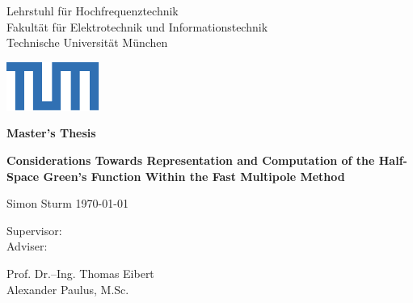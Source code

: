 \begin{titlepage}
	

	\newcommand{\UniversitaetLogoBreite}{19mm}
	\newcommand{\UniversitaetLogoHoehe}{1cm}

	\linespread{1}	
	\vspace*{-1cm}
    
	\setlength{\parindent}{0cm} 
	\begin{center}
		\begin{minipage}[l]{\textwidth-\UniversitaetLogoBreite}
			{ \footnotesize \color{TUMBlau}
				{\selectfont \small
					\textsf{Lehrstuhl für Hochfrequenztechnik\\
					Fakultät für Elektrotechnik und Informationstechnik\\
					Technische Universität München}\par}
			}
		\end{minipage}%
		\begin{minipage}[r]{\UniversitaetLogoBreite} %
			\includegraphics[width=\textwidth]{./titlepage/TUM_Logo_Web.pdf}
		\end{minipage}%
	\end{center}%
		
	\vspace{5cm}
	\Huge
	\textbf{Master's Thesis}
	\vspace{1.5cm}
	\LARGE
	\begin{flushleft}	
		\textbf{Considerations Towards Representation and Computation
		of the Half-Space Green's Function Within the Fast Multipole Method}
	\end{flushleft}
	\vspace{1cm}
	Simon Sturm  \qquad \qquad \today \\
	[3cm] 
	\large	
	\parbox[b][3cm][t]{2.2cm}{
		Supervisor: \\
	    Adviser: }
	\parbox[b][3cm][t]{6cm}{
		Prof. Dr.--Ing. Thomas Eibert\\
		Alexander Paulus, M.Sc.
		}				

\end{titlepage}	 
